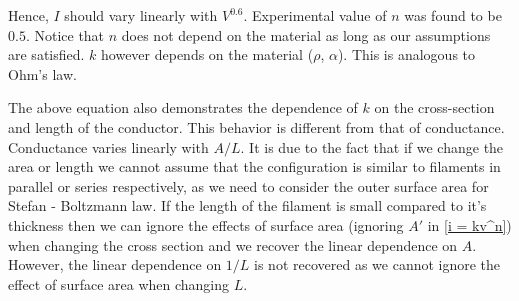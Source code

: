 \documentclass[titlepage, a4paper, 11pt]{article}
\begin{document}
Hence, $I$ should vary linearly with $V^{0.6}$. Experimental value of $n$ was found to be $0.5$.
Notice that $n$ does not depend on the material as long as our assumptions are satisfied. $k$
however depends on the material ($\rho$, $\alpha$). This is analogous to Ohm's law.

The above equation also demonstrates the dependence of $k$ on the cross-section and length of the
conductor. This behavior is different from that of conductance. Conductance varies linearly with
$A/L$. It is due to the fact that if we change the area or length we cannot assume that
the configuration is similar to filaments in parallel or series respectively, as we need to
consider the outer surface area for Stefan - Boltzmann law. If the length of the filament is
small compared to it's thickness then we can ignore the effects of surface area (ignoring $A'$ in
\eqref{i = kv^n}) when changing the cross section and we recover the linear dependence on $A$.
However, the linear dependence on $1/L$ is not recovered as we cannot ignore the effect of surface
area when changing $L$.
\end{document}
